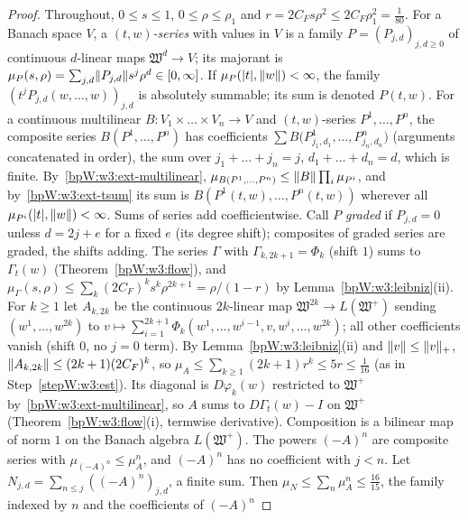 \begin{proof}
Throughout, $0\le s\le1$, $0\le\rho\le\rho_1$ and $r=2C_Fs\rho^2\le2C_F\rho_1^2=\frac1{80}$.
\label{stepW:w3:majcalc}
For a Banach space $V$, a \emph{$(t,w)$-series} with values in $V$ is a family $P=(P_{j,d})_{j,d\ge0}$ of continuous
$d$-linear maps $\mathfrak W^d\to V$; its majorant is $\mu_P(s,\rho)=\sum_{j,d}\lVert P_{j,d}\rVert s^j\rho^d\in[0,\infty]$.
If $\mu_P(\lvert t\rvert,\lVert w\rVert)<\infty$, the family $(t^jP_{j,d}(w,\dots,w))_{j,d}$ is absolutely summable; its sum is
denoted $P(t,w)$. For a continuous multilinear $B:V_1\times\dots\times V_n\to V$ and $(t,w)$-series $P^1,\dots,P^n$,
the composite series $B(P^1,\dots,P^n)$ has coefficients
$\sum B\bigl(P^1_{j_1,d_1},\dots,P^n_{j_n,d_n}\bigr)$ (arguments concatenated in order), the sum over
$j_1+\dots+j_n=j$, $d_1+\dots+d_n=d$, which is finite. By~\ref{bpW:w3:ext-multilinear},
$\mu_{B(P^1,\dots,P^n)}\le\lVert B\rVert\prod_i\mu_{P^i}$, and by~\ref{bpW:w3:ext-tsum} its sum is
$B(P^1(t,w),\dots,P^n(t,w))$ wherever all $\mu_{P^i}(\lvert t\rvert,\lVert w\rVert)<\infty$. Sums of series add coefficientwise.
Call $P$ \emph{graded} if $P_{j,d}=0$ unless $d=2j+e$ for a fixed $e$ (its degree shift); composites of graded
series are graded, the shifts adding.
\label{stepW:w3:majflow}
The series $\Gamma$ with $\Gamma_{k,2k+1}=\Phi_k$ (shift $1$) sums to $\Gamma_t(w)$ (Theorem~\ref{bpW:w3:flow}), and
$\mu_\Gamma(s,\rho)\le\sum_k(2C_F)^ks^k\rho^{2k+1}=\rho/(1-r)$ by Lemma~\ref{bpW:w3:leibniz}(ii).
\label{stepW:w3:majA}
For $k\ge1$ let $A_{k,2k}$ be the continuous $2k$-linear map $\mathfrak W^{2k}\to L(\mathfrak W^+)$ sending
$(w^1,\dots,w^{2k})$ to $v\mapsto\sum_{i=1}^{2k+1}\Phi_k(w^1,\dots,w^{i-1},v,w^i,\dots,w^{2k})$; all other
coefficients vanish (shift $0$, no $j=0$ term). By Lemma~\ref{bpW:w3:leibniz}(ii) and $\lVert v\rVert\le\lVert v\rVert_+$,
$\lVert A_{k,2k}\rVert\le(2k+1)(2C_F)^k$, so $\mu_A\le\sum_{k\ge1}(2k+1)r^k\le5r\le\frac1{16}$ (as in
Step~\ref{stepW:w3:est}). Its diagonal is $D\varphi_k(w)$ restricted to $\mathfrak W^+$ by~\ref{bpW:w3:ext-multilinear}, so
$A$ sums to $D\Gamma_t(w)-I$ on $\mathfrak W^+$ (Theorem~\ref{bpW:w3:flow}(i), termwise derivative).
\label{stepW:w3:majN}
Composition is a bilinear map of norm $1$ on the Banach algebra $L(\mathfrak W^+)$. The powers $(-A)^n$ are composite
series with $\mu_{(-A)^n}\le\mu_A^n$, and $(-A)^n$ has no coefficient with $j<n$. Let $N_{j,d}=\sum_{n\le j}((-A)^n)_{j,d}$,
a finite sum. Then $\mu_N\le\sum_n\mu_A^n\le\frac{16}{15}$, the family indexed by $n$ and the coefficients of $(-A)^n$

\end{proof}
